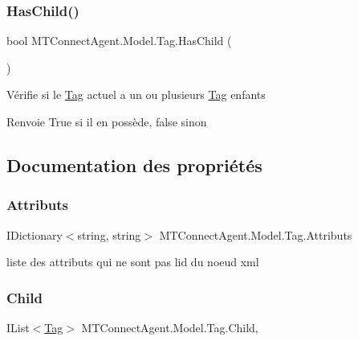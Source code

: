 \subsubsection{\texorpdfstring{Has\+Child()}{HasChild()}}
{\footnotesize\ttfamily bool M\+T\+Connect\+Agent.\+Model.\+Tag.\+Has\+Child (\begin{DoxyParamCaption}{ }\end{DoxyParamCaption})\hspace{0.3cm}{\ttfamily [inline]}}



Vérifie si le \mbox{\hyperlink{class_m_t_connect_agent_1_1_model_1_1_tag}{Tag}} actuel a un ou plusieurs \mbox{\hyperlink{class_m_t_connect_agent_1_1_model_1_1_tag}{Tag}} enfants 

\begin{DoxyReturn}{Renvoie}
True si il en possède, false sinon
\end{DoxyReturn}


\subsection{Documentation des propriétés}
\mbox{\label{class_m_t_connect_agent_1_1_model_1_1_tag_a52005acad928b8e2c84b6dbfbdb2603f}} 
\subsubsection{\texorpdfstring{Attributs}{Attributs}}
{\footnotesize\ttfamily I\+Dictionary$<$string, string$>$ M\+T\+Connect\+Agent.\+Model.\+Tag.\+Attributs\hspace{0.3cm}{\ttfamily [get]}}



liste des attributs qui ne sont pas l\textquotesingle{}id du noeud xml 

\mbox{\label{class_m_t_connect_agent_1_1_model_1_1_tag_a4aca782fa5c34818b94fb4c0beceab4b}} 
\subsubsection{\texorpdfstring{Child}{Child}}
{\footnotesize\ttfamily I\+List$<$\mbox{\hyperlink{class_m_t_connect_agent_1_1_model_1_1_tag}{Tag}}$>$ M\+T\+Connect\+Agent.\+Model.\+Tag.\+Child\hspace{0.3cm}{\ttfamily [get]}, {}}



